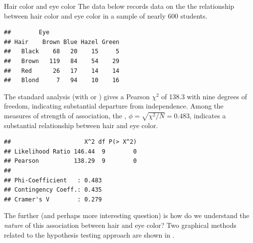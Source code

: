 \documentclass[11pt]{book}
\renewenvironment{knitrout}{\small\renewcommand{\baselinestretch}{.85}}{} %
\begin{document}
\begin{Example}[haireye0]{Hair color and eye color}
%
The data  below
records data on the the relationship between hair color and eye color
in a sample of nearly 600 students.
\begin{knitrout}
\color{fgcolor}\begin{kframe}
\begin{alltt}
 \hlkwb{<-}  \hlstd{(}\hlstd{,} \hlstd{)))}
\end{alltt}
\begin{verbatim}
##        Eye
## Hair    Brown Blue Hazel Green
##   Black    68   20    15     5
##   Brown   119   84    54    29
##   Red      26   17    14    14
##   Blond     7   94    10    16
\end{verbatim}
\end{kframe}
\end{knitrout}

The standard analysis (with  or )
gives a 
Pearson \(\chi^2\) of 138.3 with nine degrees of freedom,
indicating substantial departure from independence.  Among the measures of
strength of association, the ,
$\phi = \sqrt{\chi^2 / N} = 0.483$, indicates a substantial relationship
between hair and eye color.

\begin{knitrout}
\color{fgcolor}\begin{kframe}
\begin{alltt}
\end{alltt}
\begin{verbatim}
##                     X^2 df P(> X^2)
## Likelihood Ratio 146.44  9        0
## Pearson          138.29  9        0
## 
## Phi-Coefficient   : 0.483 
## Contingency Coeff.: 0.435 
## Cramer's V        : 0.279
\end{verbatim}
\end{kframe}
\end{knitrout}
The further (and perhaps more interesting question) is how do we
understand the \emph{nature} of this association between hair
and eye color?
Two graphical methods related to the hypothesis testing approach
are shown in .

\begin{knitrout}
\color{fgcolor}\begin{figure}[!htbp]



\end{figure}
\end{knitrout}
\end{Example}
\end{document}
